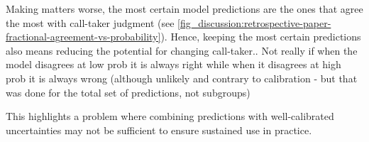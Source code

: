 
Making matters worse, the most certain model predictions are the ones that agree the most with call-taker judgment (see \cref{fig_discussion:retrospective-paper-fractional-agreement-vs-probability}). Hence, keeping the most certain predictions also means reducing the potential for changing call-taker.. Not really if when the model disagrees at low prob it is always right while when it disagrees at high prob it is always wrong (although unlikely and contrary to calibration - but that was done for the total set of predictions, not subgroups)


This highlights a problem where combining predictions with well-calibrated uncertainties may not be sufficient to ensure sustained use in practice.




